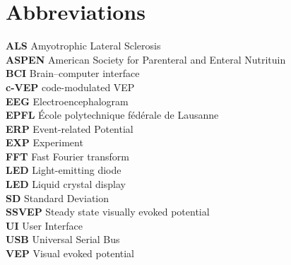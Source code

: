 \chapter{Abbreviations}
\textbf{ALS} Amyotrophic Lateral Sclerosis\\
\textbf{ASPEN}	American Society for Parenteral and Enteral Nutrituin\\
\textbf{BCI}	Brain–computer interface\\
\textbf{c-VEP}	code-modulated VEP\\
\textbf{EEG}	Electroencephalogram\\
\textbf{EPFL}	École polytechnique fédérale de Lausanne\\
\textbf{ERP}	Event-related Potential\\
\textbf{EXP}	Experiment\\
\textbf{FFT}	Fast Fourier transform\\
\textbf{LED}	Light-emitting diode\\
\textbf{LED}	Liquid crystal display\\
\textbf{SD}		Standard Deviation\\
\textbf{SSVEP}	Steady state visually evoked potential\\
\textbf{UI}		User Interface\\
\textbf{USB}		Universal Serial Bus\\
\textbf{VEP}		Visual evoked potential\\
